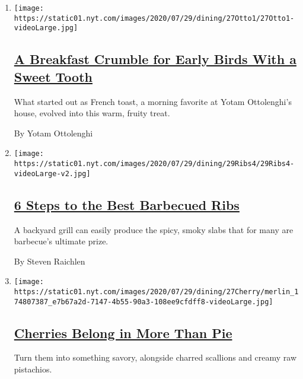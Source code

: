 \begin{enumerate}
\def\labelenumi{\arabic{enumi}.}
\item
  \texttt{[image: https://static01.nyt.com/images/2020/07/29/dining/27Otto1/27Otto1-videoLarge.jpg]}

  \hypertarget{a-breakfast-crumble-for-early-birds-with-a-sweet-tooth}{%
  \subsection{\texorpdfstring{\href{/2020/07/27/dining/breakfast-crumble-recipe.html}{A
  Breakfast Crumble for Early Birds With a Sweet
  Tooth}}{A Breakfast Crumble for Early Birds With a Sweet Tooth}}\label{a-breakfast-crumble-for-early-birds-with-a-sweet-tooth}}

  What started out as French toast, a morning favorite at Yotam
  Ottolenghi's house, evolved into this warm, fruity treat.

  By Yotam Ottolenghi
\item
  \texttt{[image: https://static01.nyt.com/images/2020/07/29/dining/29Ribs4/29Ribs4-videoLarge-v2.jpg]}

  \hypertarget{6-steps-to-the-best-barbecued-ribs}{%
  \subsection{\texorpdfstring{\href{/2020/07/24/dining/bbq-ribs-recipe.html}{6
  Steps to the Best Barbecued
  Ribs}}{6 Steps to the Best Barbecued Ribs}}\label{6-steps-to-the-best-barbecued-ribs}}

  A backyard grill can easily produce the spicy, smoky slabs that for
  many are barbecue's ultimate prize.

  By Steven Raichlen
\item
  \texttt{[image: https://static01.nyt.com/images/2020/07/29/dining/27Cherry/merlin\_174807387\_e7b67a2d-7147-4b55-90a3-108ee9cfdff8-videoLarge.jpg]}

  \hypertarget{cherries-belong-in-more-than-pie}{%
  \subsection{\texorpdfstring{\href{/2020/07/24/dining/cherry-salad-recipe.html}{Cherries
  Belong in More Than
  Pie}}{Cherries Belong in More Than Pie}}\label{cherries-belong-in-more-than-pie}}

  Turn them into something savory, alongside charred scallions and
  creamy raw pistachios.


\end{enumerate}
